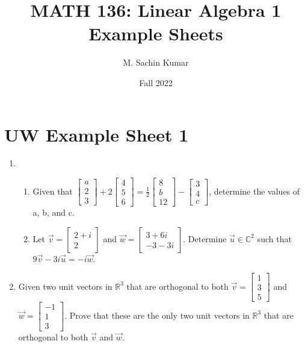 \documentclass{report}
\newcommand{\C}{{\mathbb{C}}}
\newcommand{\R}{{\mathbb{R}}}
\begin{document}
\title{MATH 136: Linear Algebra 1\\
{Example Sheets}}
\author{M. Sachin Kumar}
\date{Fall 2022}

\maketitle

\chapter*{UW Example Sheet 1}
\begin{enumerate}
    \item \begin{enumerate}
        \item Given that $\begin{bmatrix} a \\ 2 \\ 3 \end{bmatrix} + 2 \begin{bmatrix} 4 \\ 5 \\ 6 \end{bmatrix} = \frac{1}{2} \begin{bmatrix} 8 \\ b \\ 12 \end{bmatrix} - \begin{bmatrix} 3 \\ 4 \\ c \end{bmatrix}$, determine the values of a, b, and c.
        \item Let $\vec{v} = \begin{bmatrix} 2 + i\\2 \end{bmatrix}$ and $\vec{w} = \begin{bmatrix} 3 + 6i \\ -3 - 3i\end{bmatrix}$. Determine $\vec{u} \in \C^2$ such that $9\vec{v} - 3i\vec{u} = -i\vec{w}$.
    \end{enumerate}
    \item Given two unit vectors in $\R^3$ that are orthogonal to both $\vec{v} = \begin{bmatrix} 1 \\ 3 \\ 5\end{bmatrix}$ and $\vec{w} = \begin{bmatrix} -1 \\ 1 \\ 3\end{bmatrix}$. Prove that these are the only two unit vectors in $\R^3$ that are orthogonal to both $\vec{v}$ and $\vec{w}$.

\end{enumerate}
\end{document}
